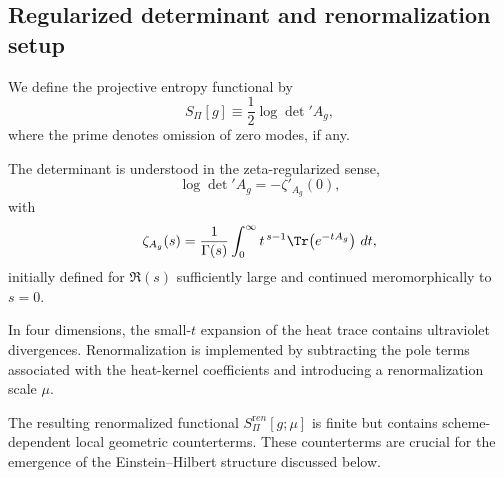 \subsection{Regularized determinant and renormalization setup}
\label{subsec:zeta-regularization}

We define the projective entropy functional by
\begin{equation}
  S_\Pi[g] \equiv \frac12 \log \det\nolimits' A_g ,
\end{equation}
where the prime denotes omission of zero modes, if any.

The determinant is understood in the zeta-regularized sense,
\begin{equation}
  \log \det\nolimits' A_g = -\zeta'_{A_g}(0) ,
\end{equation}
with
\begin{equation}
  \zeta_{A_g}(s)
  =
  \frac{1}{\Gamma(s)}
  \int_0^\infty
  t^{\,s-1}
  \Tr\!\left(e^{-tA_g}\right)\,dt ,
\end{equation}
initially defined for $\Re(s)$ sufficiently large and continued meromorphically to $s=0$.

In four dimensions, the small-$t$ expansion of the heat trace contains ultraviolet divergences.
Renormalization is implemented by subtracting the pole terms associated with the heat-kernel coefficients and introducing a renormalization scale $\mu$.

The resulting renormalized functional $S_\Pi^{\mathrm ren}[g;\mu]$ is finite but contains scheme-dependent local geometric counterterms.
These counterterms are crucial for the emergence of the Einstein--Hilbert structure discussed below.
